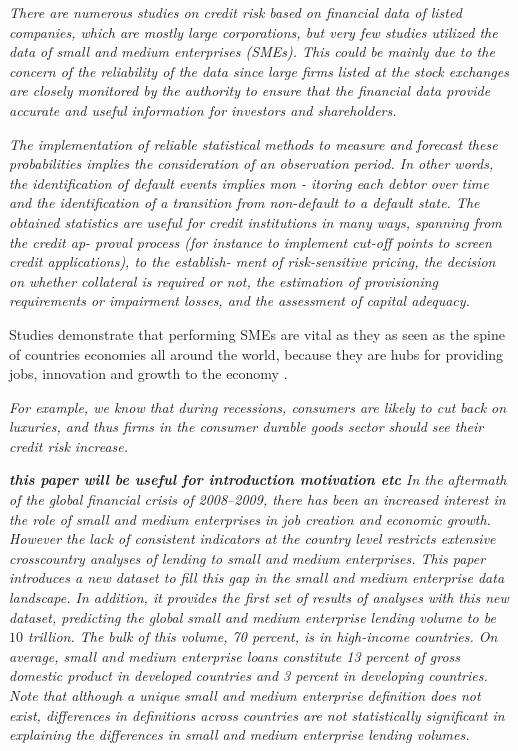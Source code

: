 \textit{There  are  numerous  studies  on  credit 
	risk based on financial data of listed companies, which are mostly 
	large  corporations,  but  very  few  studies  utilized  the  data  of  small 
	and  medium  enterprises  (SMEs).  This  could  be  mainly  due  to  the 
	concern of the reliability of the data since large firms listed at the 
	stock  exchanges  are  closely  monitored  by  the  authority  to  ensure 
	that the financial data provide accurate and useful information for 
	investors and shareholders. \citep{sirirattanaphonkun_default_2012}}

\textit{The
	implementation of reliable statistical methods to measure and forecast these probabilities implies the
	consideration of an observation period. In other words, the identification of default events implies mon
	-
	itoring each debtor over time and the identification of a transition from non-default to a default state.
	The obtained statistics are useful for credit institutions in many ways, spanning from the credit ap-
	proval process (for instance to implement cut-off points to screen credit applications), to the establish-
	ment of risk-sensitive pricing, the decision on whether collateral is required or not, the estimation of
	provisioning requirements or impairment losses, and the assessment of capital adequacy.
	\citep{antunes_estimating_2005}}

Studies demonstrate that performing SMEs are vital as they as seen as the spine of countries economies all around the world, because they are hubs for providing jobs, innovation and growth to the economy \citep{craig_sba-guaranteed_2004}.


\textit{For example, we know that during recessions, consumers
	are likely to cut back on luxuries, and thus firms in the consumer durable goods sector
	should see their credit risk increase. \citep{hackbarth_capital_2006}}

\textit{ \textbf{this paper will be useful for introduction motivation etc}
In the aftermath of the global financial crisis of
2008–2009, there has been an increased interest in the
role of small and medium enterprises in job creation
and economic growth. However the lack of consistent
indicators at the country level restricts extensive crosscountry
analyses of lending to small and medium
enterprises. This paper introduces a new dataset to fill this
gap in the small and medium enterprise data landscape.
In addition, it provides the first set of results of analyses
with this new dataset, predicting the global small and 
medium enterprise lending volume to be $10$ trillion.
The bulk of this volume, 70 percent, is in high-income
countries. On average, small and medium enterprise
loans constitute 13 percent of gross domestic product
in developed countries and 3 percent in developing
countries. Note that although a unique small and
medium enterprise definition does not exist, differences
in definitions across countries are not statistically
significant in explaining the differences in small and
medium enterprise lending volumes.
\citep{ardic_small_2011}
}


